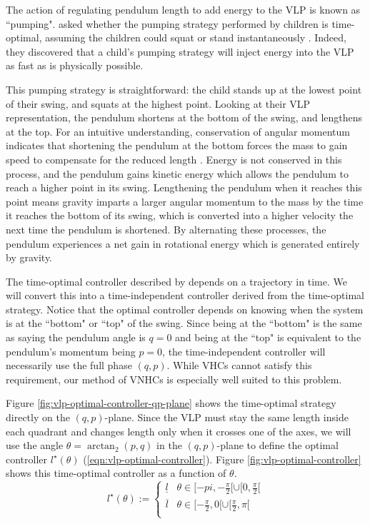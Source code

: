 The action of regulating pendulum length to add energy to the VLP is known as
``pumping". \citeauthor{pumping_swing_standing_squatting} asked whether
the pumping strategy performed by children is time-optimal, assuming the
children could squat or stand instantaneously
\cite{pumping_swing_standing_squatting}. Indeed, they discovered that 
a child's pumping strategy will inject energy into the VLP as fast as is 
physically possible. 

This pumping strategy is straightforward: the child stands up at the lowest point of
their swing, and squats at the highest point. Looking at their VLP
representation, the pendulum shortens at the bottom of the swing, and lengthens
at the top. For an intuitive understanding, conservation of angular momentum
indicates that shortening the pendulum at the bottom forces the mass to gain
speed to compensate for the reduced length
\cite{how_to_pump_a_swing}.
Energy is not conserved in this process, and the pendulum gains kinetic energy
which allows the pendulum to reach a higher point in its swing.
Lengthening the pendulum when it reaches this point means gravity
imparts a larger angular momentum to the mass by the time it reaches the bottom
of its swing, which is converted into a higher velocity the next time the
pendulum is shortened.
By alternating these processes, the pendulum experiences a net gain in
rotational energy which is generated entirely by gravity.

The time-optimal controller described by \cite{pumping_swing_standing_squatting}
depends on a trajectory in time. We will convert this 
into a time-independent controller derived from the time-optimal
strategy. Notice that the optimal controller depends on knowing when the
system is at the ``bottom" or ``top" of the swing. Since being at the ``bottom"
is the same as saying the pendulum angle is \(q = 0\) and being at the ``top" is
equivalent to the pendulum's momentum being \(p = 0\), the time-independent
controller will necessarily use the full phase \((q,p)\). While VHCs cannot
satisfy this requirement, our method of VNHCs is especially well suited to this
problem.

Figure \ref{fig:vlp-optimal-controller-qp-plane} shows the time-optimal strategy directly
on the \((q,p)\)-plane.
Since the VLP must stay the same length inside each quadrant and
changes length only when it crosses one of the axes, we
will use the angle \(\theta = \arctan_2(p,q)\) in the \((q,p)\)-plane to define
the optimal controller \(l^\star(\theta)\) (\ref{eqn:vlp-optimal-controller}).
Figure \ref{fig:vlp-optimal-controller} shows this time-optimal controller as a function of
\(\theta\).
\begin{equation}\label{eqn:vlp-optimal-controller}
   l^\star(\theta):= \begin{cases}
      \underline{l} & \theta \in [-pi, -\frac{\pi}{2}[ \cup [0,\frac{\pi}{2}[ \\
      \overline{l} & \theta \in [-\frac{\pi}{2},0[ \cup [\frac{\pi}{2}, \pi[ \\
   \end{cases}
\end{equation}

